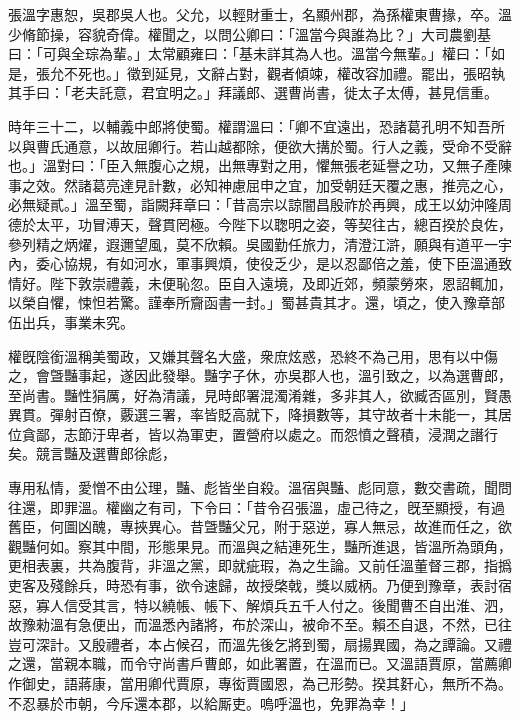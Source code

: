 \begin{pinyinscope}
 
 
 張溫字惠恕，吳郡吳人也。父允，以輕財重士，名顯州郡，為孫權東曹掾，卒。溫少脩節操，容貌奇偉。權聞之，以問公卿曰：「溫當今與誰為比？」大司農劉基曰：「可與全琮為輩。」太常顧雍曰：「基未詳其為人也。溫當今無輩。」權曰：「如是，張允不死也。」徵到延見，文辭占對，觀者傾竦，權改容加禮。罷出，張昭執其手曰：「老夫託意，君宜明之。」拜議郎、選曹尚書，徙太子太傅，甚見信重。
 
 
 
 
 時年三十二，以輔義中郎將使蜀。權謂溫曰：「卿不宜遠出，恐諸葛孔明不知吾所以與曹氏通意，以故屈卿行。若山越都除，便欲大搆於蜀。行人之義，受命不受辭也。」溫對曰：「臣入無腹心之規，出無專對之用，懼無張老延譽之功，又無子產陳事之效。然諸葛亮達見計數，必知神慮屈申之宜，加受朝廷天覆之惠，推亮之心，必無疑貳。」溫至蜀，詣闕拜章曰：「昔高宗以諒闇昌殷祚於再興，成王以幼沖隆周德於太平，功冒溥天，聲貫罔極。今陛下以聦明之姿，等契往古，總百揆於良佐，參列精之炳燿，遐邇望風，莫不欣賴。吳國勤任旅力，清澄江滸，願與有道平一宇內，委心協規，有如河水，軍事興煩，使役乏少，是以忍鄙倍之羞，使下臣溫通致情好。陛下敦崇禮義，未便恥忽。臣自入遠境，及即近郊，頻蒙勞來，恩詔輒加，以榮自懼，悚怛若驚。謹奉所齎函書一封。」蜀甚貴其才。還，頃之，使入豫章部伍出兵，事業未究。
 
 
 
 
 權旣陰銜溫稱美蜀政，又嫌其聲名大盛，衆庶炫惑，恐終不為己用，思有以中傷之，會曁豔事起，遂因此發舉。豔字子休，亦吳郡人也，溫引致之，以為選曹郎，至尚書。豔性狷厲，好為清議，見時郎署混濁淆雜，多非其人，欲臧否區別，賢愚異貫。彈射百僚，覈選三署，率皆貶高就下，降損數等，其守故者十未能一，其居位貪鄙，志節汙卑者，皆以為軍吏，置營府以處之。而怨憤之聲積，浸潤之譖行矣。競言豔及選曹郎徐彪，
 
 
 專用私情，愛憎不由公理，豔、彪皆坐自殺。溫宿與豔、彪同意，數交書疏，聞問往還，即罪溫。權幽之有司，下令曰：「昔令召張溫，虛己待之，旣至顯授，有過舊臣，何圖凶醜，專挾異心。昔曁豔父兄，附于惡逆，寡人無忌，故進而任之，欲觀豔何如。察其中間，形態果見。而溫與之結連死生，豔所進退，皆溫所為頭角，更相表裏，共為腹背，非溫之黨，即就疵瑕，為之生論。又前任溫董督三郡，指撝吏客及殘餘兵，時恐有事，欲令速歸，故授棨戟，獎以威柄。乃便到豫章，表討宿惡，寡人信受其言，特以繞帳、帳下、解煩兵五千人付之。後聞曹丕自出淮、泗，故豫勑溫有急便出，而溫悉內諸將，布於深山，被命不至。賴丕自退，不然，已往豈可深計。又殷禮者，本占候召，而溫先後乞將到蜀，扇揚異國，為之譚論。又禮之還，當親本職，而令守尚書戶曹郎，如此署置，在溫而已。又溫語賈原，當薦卿作御史，語蔣康，當用卿代賈原，專衒賈國恩，為己形勢。揆其姧心，無所不為。不忍暴於巿朝，今斥還本郡，以給厮吏。嗚呼溫也，免罪為幸！」
 

\end{pinyinscope}
